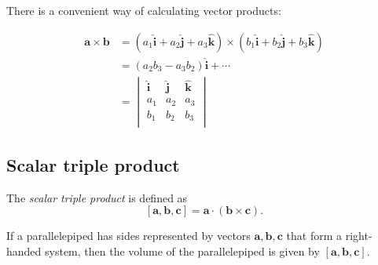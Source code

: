 \documentclass[a4paper]{article}
\begin{document}
There is a convenient way of calculating vector products:
\begin{prop}
  \begin{align*}
    \mathbf{a\times b} &= (a_1\hat{\mathbf{i}} + a_2\hat{\mathbf{j}} + a_3\hat{\mathbf{k}})\times(b_1\hat{\mathbf{i}} + b_2\hat{\mathbf{j}} + b_3\hat{\mathbf{k}})\\
    &= (a_2b_3 - a_3b_2)\hat{\mathbf{i}} + \cdots\\
    &= \begin{vmatrix} \hat{\mathbf{i}} & \hat{\mathbf{j}} & \hat{\mathbf{k}}\\
      a_1 & a_2 & a_3\\
      b_1 & b_2 & b_3\\
    \end{vmatrix}
  \end{align*}
\end{prop}

\subsection{Scalar triple product}
\begin{defi}
  The \emph{scalar triple product} is defined as
  \[
    \mathbf{[a, b, c] = a\cdot (b\times c)}.
  \]
\end{defi}

\begin{prop}
  If a parallelepiped has sides represented by vectors $\mathbf{a, b, c}$ that form a right-handed system, then the volume of the parallelepiped is given by $\mathbf{[a, b, c]}$.
\end{prop}
\begin{center}
\end{center}
\end{document}
